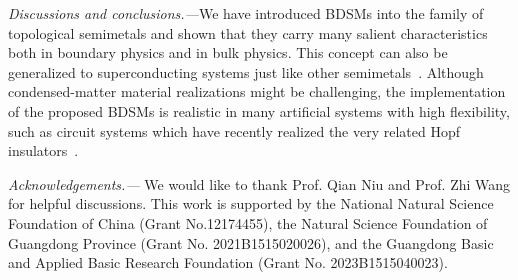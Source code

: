 \documentclass[aps,prl,twocolumn,longbibliography]{revtex4-1}
\begin{document}
{\it Discussions and conclusions.---}We have introduced BDSMs into the
family of topological semimetals and shown that they carry many salient
characteristics both in boundary physics and in bulk physics. This concept can also
be generalized to superconducting systems just like other semimetals~\cite{Yang2014dirac}.
Although condensed-matter material realizations might be challenging,
the implementation of the proposed BDSMs is realistic in many artificial systems with
high flexibility, such as circuit systems which have recently realized the very related
Hopf insulators~\cite{Wang2023hopf}.



{\it Acknowledgements.---}
We would like to thank Prof. Qian Niu and Prof. Zhi Wang for helpful discussions.
This work is supported by the National Natural Science Foundation of China (Grant No.12174455),
the Natural Science Foundation of Guangdong Province
(Grant No. 2021B1515020026), and the Guangdong
Basic and Applied Basic Research Foundation (Grant No.
2023B1515040023).






\end{document}
